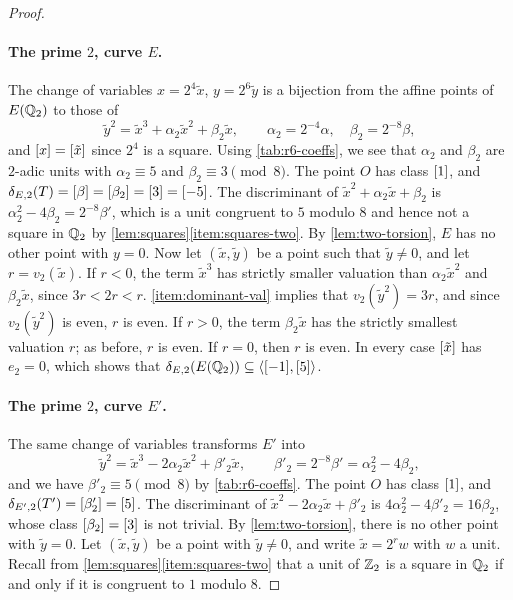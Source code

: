 \begin{proof}
\paragraph{The prime $2$, curve $E$.} The change of variables $x=2^4\tilde x$, $y=2^6\tilde y$ is a bijection from the affine points of $E(\mathbb Q_2)$ to those of
\[
\tilde y^2=\tilde x^3+\alpha_2\tilde x^2+\beta_2\tilde x,\qquad \alpha_2=2^{-4}\alpha,\quad \beta_2=2^{-8}\beta,
\]
and $[x]=[\tilde x]$ since $2^4$ is a square. Using \cref{tab:r6-coeffs}, we see that $\alpha_2$ and $\beta_2$ are $2$-adic units with $\alpha_2\equiv5$ and $\beta_2\equiv3\pmod8$. The point $O$ has class $[1]$, and $\delta_{E,2}(T)=[\beta]=[\beta_2]=[3]=[-5]$. The discriminant of $\tilde x^2+\alpha_2\tilde x+\beta_2$ is $\alpha_2^2-4\beta_2=2^{-8}\beta'$, which is a unit congruent to $5$ modulo $8$ and hence not a square in $\mathbb Q_2$ by \cref{lem:squares}\ref{item:squares-two}. By \cref{lem:two-torsion}, $E$ has no other point with $y=0$. Now let $(\tilde x,\tilde y)$ be a point such that $\tilde y\ne0$, and let $r=v_2(\tilde x)$. If $r<0$, the term $\tilde x^3$ has strictly smaller valuation than $\alpha_2\tilde x^2$ and $\beta_2\tilde x$, since $3r<2r<r$. \ref{item:dominant-val} implies that $v_2(\tilde y^2)=3r$, and since $v_2(\tilde y^2)$ is even, $r$ is even. If $r>0$, the term $\beta_2\tilde x$ has the strictly smallest valuation $r$; as before, $r$ is even. If $r=0$, then $r$ is even. In every case $[\tilde x]$ has $e_2=0$, which shows that $\delta_{E,2}(E(\mathbb Q_2))\subseteq\langle[-1],[5]\rangle$.

\paragraph{The prime $2$, curve $E'$.} The same change of variables transforms $E'$ into
\[
\tilde y^2=\tilde x^3-2\alpha_2\tilde x^2+\beta'_2\tilde x,\qquad \beta'_2=2^{-8}\beta'=\alpha_2^2-4\beta_2,
\]
and we have $\beta'_2\equiv5\pmod 8$ by \cref{tab:r6-coeffs}. The point $O$ has class $[1]$, and $\delta_{E',2}(T')=[\beta'_2]=[5]$. The discriminant of $\tilde x^2-2\alpha_2\tilde x+\beta'_2$ is $4\alpha_2^2-4\beta'_2=16\beta_2$, whose class $[\beta_2]=[3]$ is not trivial. By \cref{lem:two-torsion}, there is no other point with $\tilde y=0$. Let $(\tilde x,\tilde y)$ be a point with $\tilde y\ne0$, and write $\tilde x=2^rw$ with $w$ a unit. Recall from \cref{lem:squares}\ref{item:squares-two} that a unit of $\mathbb Z_2$ is a square in $\mathbb Q_2$ if and only if it is congruent to $1$ modulo $8$.


\end{proof}
